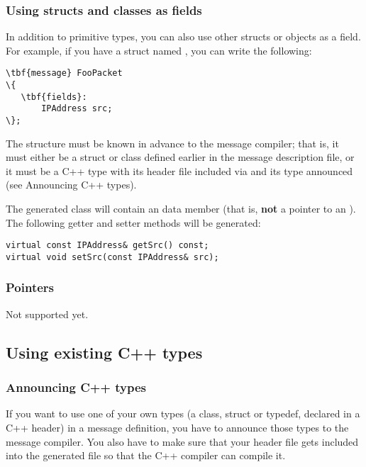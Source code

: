 \subsubsection{Using structs and classes as fields}

In addition to primitive types, you can also use other structs or objects
as a field. For example, if you have a struct named ,
you can write the following:

\begin{Verbatim}[commandchars=\\\{\}]
\tbf{message} FooPacket
\{
   \tbf{fields}:
       IPAddress src;
\};
\end{Verbatim}

The  structure must be known in advance to the message compiler;
that is, it must either be a struct or class defined earlier in the message
description file, or it must be a C++ type with its header file
included via  and its type announced
(see Announcing C++ types).

The generated class will contain an  data member
(that is, \textbf{not} a pointer to an ).
The following getter and setter methods will be generated:

\begin{verbatim}
virtual const IPAddress& getSrc() const;
virtual void setSrc(const IPAddress& src);
\end{verbatim}


\subsubsection{Pointers}

Not supported yet.



\subsection{Using existing C++ types}


\subsubsection{Announcing C++ types}

If you want to use one of your own types (a class, struct or typedef,
declared in a C++ header) in a message definition, you have to
announce those types to the message compiler. You also have to make sure
that your header file gets included into the generated  file
so that the C++ compiler can compile it.


